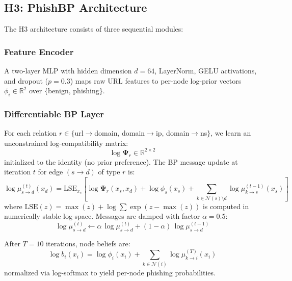 \documentclass[conference]{IEEEtran}
\begin{document}
\subsection{H3: PhishBP Architecture}
\label{sec:h3}

The H3 architecture consists of three sequential modules:

\subsubsection{Feature Encoder}
A two-layer MLP with hidden dimension $d = 64$, LayerNorm, GELU activations,
and dropout ($p = 0.3$) maps raw URL features to per-node log-prior vectors
$\phi_i \in \mathbb{R}^2$ over $\{$benign, phishing$\}$.

\subsubsection{Differentiable BP Layer}
For each relation $r \in \{$url$\to$domain, domain$\to$ip, domain$\to$ns$\}$,
we learn an unconstrained log-compatibility matrix:
\begin{equation}
  \log \boldsymbol{\Psi}_r \in \mathbb{R}^{2 \times 2}
\end{equation}
initialized to the identity (no prior preference). The BP message update at
iteration $t$ for edge $(s \to d)$ of type $r$ is:
\begin{equation}
  \log \mu_{s \to d}^{(t)}(x_d) = \mathrm{LSE}_{x_s}\!\left[
    \log \boldsymbol{\Psi}_r(x_s, x_d)
    + \log \phi_s(x_s)
    + \!\!\sum_{k \in \mathcal{N}(s) \setminus d}\!\! \log \mu_{k \to s}^{(t-1)}(x_s)
  \right]
\end{equation}
where $\mathrm{LSE}(z) = \max(z) + \log\sum\exp(z - \max(z))$ is computed in
numerically stable log-space. Messages are damped with factor $\alpha = 0.5$:
\begin{equation}
  \log \mu_{s \to d}^{(t)} \leftarrow
    \alpha\, \log \mu_{s \to d}^{(t)}
    + (1 - \alpha)\, \log \mu_{s \to d}^{(t-1)}
\end{equation}

After $T = 10$ iterations, node beliefs are:
\begin{equation}
  \log b_i(x_i) = \log \phi_i(x_i) + \sum_{k \in \mathcal{N}(i)} \log \mu_{k \to i}^{(T)}(x_i)
\end{equation}
normalized via log-softmax to yield per-node phishing probabilities.
\end{document}
